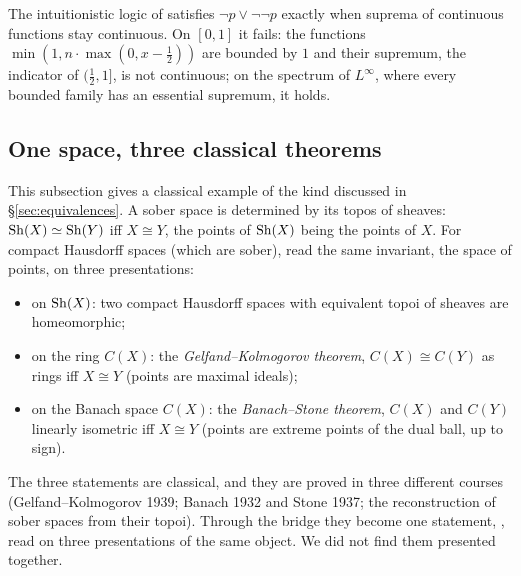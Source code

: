 \inwords{} The intuitionistic logic of  satisfies $\neg p\vee\neg\neg p$ exactly when suprema of continuous functions stay continuous. On $[0,1]$ it fails: the functions $\min(1, n\cdot\max(0, x-\tfrac12))$ are bounded by $1$ and their supremum, the indicator of $(\tfrac12,1]$, is not continuous; on the spectrum of $L^\infty$, where every bounded family has an essential supremum, it holds.

\subsection{One space, three classical theorems}

This subsection gives a classical example of the kind discussed in \S\ref{sec:equivalences}. A sober space is determined by its topos of sheaves: $\mathrm{Sh}(X)\simeq\mathrm{Sh}(Y)$ iff $X\cong Y$, the points of $\mathrm{Sh}(X)$ being the points of $X$. For compact Hausdorff spaces (which are sober), read the same invariant, the space of points, on three presentations:
\begin{itemize}
\item on $\mathrm{Sh}(X)$: two compact Hausdorff spaces with equivalent topoi of sheaves are homeomorphic;
\item on the ring $C(X)$: the \emph{Gelfand--Kolmogorov theorem}, $C(X)\cong C(Y)$ as rings iff $X\cong Y$ (points are maximal ideals);
\item on the Banach space $C(X)$: the \emph{Banach--Stone theorem}, $C(X)$ and $C(Y)$ linearly isometric iff $X\cong Y$ (points are extreme points of the dual ball, up to sign).
\end{itemize}
The three statements are classical, and they are proved in three different courses (Gelfand--Kolmogorov 1939; Banach 1932 and Stone 1937; the reconstruction of sober spaces from their topoi). Through the bridge they become one statement, , read on three presentations of the same object. We did not find them presented together.
